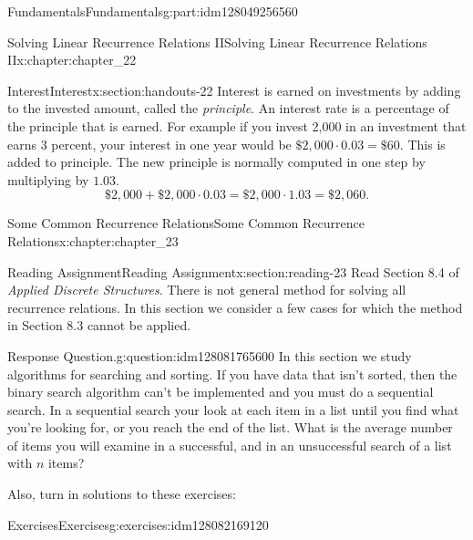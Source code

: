 \documentclass[oneside,10pt,]{book}
\numberwithin{equation}{section}
\begin{document}
\begin{partptx}{Fundamentals}{}{Fundamentals}{}{}{g:part:idm128049256560}
\begin{chapterptx}{Solving Linear Recurrence Relations II}{}{Solving Linear Recurrence Relations II}{}{}{x:chapter:chapter_22}
\typeout{************************************************}
%
\begin{sectionptx}{Interest}{}{Interest}{}{}{x:section:handouts-22}
Interest is earned on investments by adding to the invested amount, called the \emph{principle}. An interest rate is a percentage of the principle that is earned.  For example if you invest \textdollar{}2,000 in an investment  that earns 3 percent, your interest in one year would be \(\$2,000\cdot 0.03 =\$60\).  This is added to principle.  The new principle is normally computed in one step by multiplying by \(1.03\).%
\begin{equation*}
\$2,000+ \$2,000\cdot 0.03 =\$2,000\cdot 1.03 =  \$2,060.
\end{equation*}
%
\end{sectionptx}
\end{chapterptx}
%
\typeout{************************************************}
\typeout{************************************************}
%
\begin{chapterptx}{Some Common Recurrence Relations}{}{Some Common Recurrence Relations}{}{}{x:chapter:chapter_23}
\index{}%
%
%
\typeout{************************************************}
\typeout{************************************************}
%
\begin{sectionptx}{Reading Assignment}{}{Reading Assignment}{}{}{x:section:reading-23}
Read Section 8.4 of \emph{Applied Discrete Structures}. There is not general method for solving all recurrence relations.  In this section we consider a few cases for which the method in Section 8.3 cannot be applied.%
\begin{question}{Response Question.}{g:question:idm128081765600}%
In this section we study algorithms for searching and sorting.  If you have data that isn't sorted, then the binary search algorithm can't be implemented and you must do a sequential search. In a sequential search your look at each item in a list until you find what you're looking for, or you reach the end of the list.  What is the average number of items you will examine in a successful, and in an unsuccessful search of a list with \(n\) items?%
\end{question}
Also, turn in solutions to these exercises:%
%
%
\typeout{************************************************}
\typeout{************************************************}
%
\begin{exercises-subsection}{Exercises}{}{Exercises}{}{}{g:exercises:idm128082169120}

\end{exercises-subsection}
\end{sectionptx}
\end{chapterptx}
\end{partptx}
\end{document}
